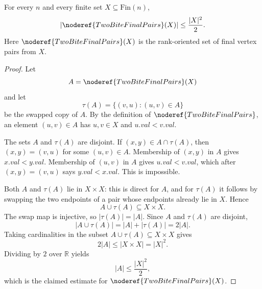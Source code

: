 \begin{helper}
For every \(n\) and every finite set \(X\subseteq \mathrm{Fin}(n)\),
\[
\left|\noderef{TwoBiteFinalPairs}(X)\right|
\le \frac{|X|^2}{2}.
\]
Here \(\noderef{TwoBiteFinalPairs}(X)\) is the rank-oriented set of final
vertex pairs from \(X\).
\end{helper}
\begin{proof}
Let
\[
A=\noderef{TwoBiteFinalPairs}(X)
\]
and let
\[
\tau(A)=\{(v,u):(u,v)\in A\}
\]
be the swapped copy of \(A\).  By the definition of
\(\noderef{TwoBiteFinalPairs}\), an element \((u,v)\in A\) has
\(u,v\in X\) and \(u.val<v.val\).

The sets \(A\) and \(\tau(A)\) are disjoint.  If
\((x,y)\in A\cap\tau(A)\), then \((x,y)=(v,u)\) for some \((u,v)\in A\).
Membership of \((x,y)\) in \(A\) gives \(x.val<y.val\).  Membership of
\((u,v)\) in \(A\) gives \(u.val<v.val\), which after
\((x,y)=(v,u)\) says \(y.val<x.val\).  This is impossible.

Both \(A\) and \(\tau(A)\) lie in \(X\times X\): this is direct for \(A\),
and for \(\tau(A)\) it follows by swapping the two endpoints of a pair whose
endpoints already lie in \(X\).  Hence
\[
A\cup\tau(A)\subseteq X\times X.
\]
The swap map is injective, so \(|\tau(A)|=|A|\).  Since \(A\) and
\(\tau(A)\) are disjoint,
\[
|A\cup\tau(A)|=|A|+|\tau(A)|=2|A|.
\]
Taking cardinalities in the subset \(A\cup\tau(A)\subseteq X\times X\) gives
\[
2|A|\le |X\times X|=|X|^2.
\]
Dividing by \(2\) over \(\mathbb R\) yields
\[
|A|\le\frac{|X|^2}{2},
\]
which is the claimed estimate for \(\noderef{TwoBiteFinalPairs}(X)\).
\end{proof}
